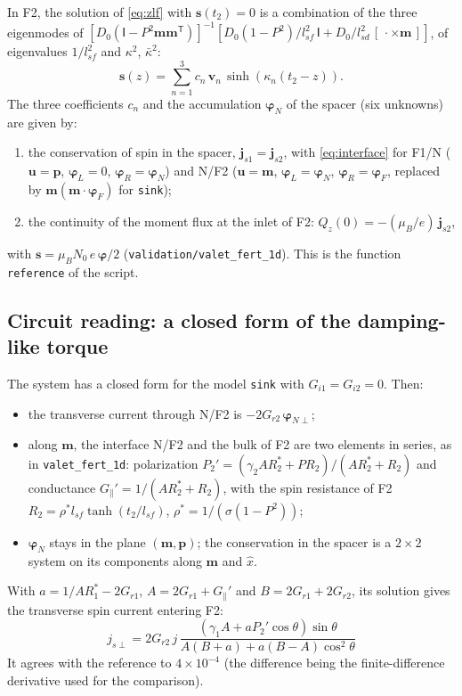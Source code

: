 \documentclass[11pt,a4paper]{article}
\newcommand{\vm}{\bm{m}}
\newcommand{\vp}{\bm{p}}
\newcommand{\vs}{\bm{s}}
\newcommand{\vu}{\bm{u}}
\newcommand{\vphi}{\bm{\varphi}}
\newcommand{\Id}{\mathsf{I}}
\begin{document}
In F2, the solution of \eqref{eq:zlf} with $\vs(t_2) = 0$ is a combination
of the three eigenmodes of $\left[D_0(\Id - P^2\vm\vm^{\mathsf{T}})\right]^{-1}
\left[D_0(1-P^2)/l_{sf}^2\,\Id + D_0/l_{sd}^2\,[\,\cdot\times\vm\,]\right]$,
of eigenvalues $1/l_{sf}^2$ and $\kappa^2$, $\bar\kappa^2$:
\begin{equation}
  \vs(z) = \sum_{n=1}^{3} c_n\,\bm{v}_n\,\sinh\left(\kappa_n(t_2-z)\right).
\end{equation}
The three coefficients $c_n$ and the accumulation $\vphi_N$ of the spacer
(six unknowns) are given by:
\begin{enumerate}
  \item the conservation of spin in the spacer, $\bm{j}_{s1} = \bm{j}_{s2}$,
    with \eqref{eq:interface} for F1/N ($\vu = \vp$, $\vphi_L = 0$,
    $\vphi_R = \vphi_N$) and N/F2 ($\vu = \vm$, $\vphi_L = \vphi_N$,
    $\vphi_R = \vphi_F$, replaced by $\vm(\vm\cdot\vphi_F)$ for
    \texttt{sink});
  \item the continuity of the moment flux at the inlet of F2:
    $Q_z(0) = -(\mu_B/e)\,\bm{j}_{s2}$,
\end{enumerate}
with $\vs = \mu_BN_0\,e\,\vphi/2$ (\texttt{validation/valet\_fert\_1d}).
This is the function \texttt{reference} of the script.

\subsection{Circuit reading: a closed form of the damping-like torque}
\label{sec:closed}

The system has a closed form for the model \texttt{sink} with
$G_{i1} = G_{i2} = 0$. Then:
\begin{itemize}
  \item the transverse current through N/F2 is $-2G_{r2}\,\vphi_{N\perp}$;
  \item along $\vm$, the interface N/F2 and the bulk of F2 are two elements
    in series, as in \texttt{valet\_fert\_1d}: polarization
    $P_2' = (\gamma_2AR_2^* + PR_2)/(AR_2^* + R_2)$ and conductance
    $G_\parallel' = 1/(AR_2^*+R_2)$, with the spin resistance of F2
    $R_2 = \rho^*l_{sf}\tanh(t_2/l_{sf})$, $\rho^* = 1/(\sigma(1-P^2))$;
  \item $\vphi_N$ stays in the plane $(\vm, \vp)$; the conservation in the
    spacer is a $2\times2$ system on its components along $\vm$ and
    $\hat x$.
\end{itemize}
With $a = 1/AR_1^* - 2G_{r1}$, $A = 2G_{r1} + G_\parallel'$ and
$B = 2G_{r1} + 2G_{r2}$, its solution gives the transverse spin current
entering F2:
\begin{equation}
  \boxed{\;j_{s\perp} = 2G_{r2}\,j\,
  \frac{\left(\gamma_1A + aP_2'\cos\theta\right)\sin\theta}
       {A(B+a) + a(B-A)\cos^2\theta}\;}
  \label{eq:closed}
\end{equation}
It agrees with the reference to $4\times10^{-4}$ (the difference being the
finite-difference derivative used for the comparison).
\end{document}
